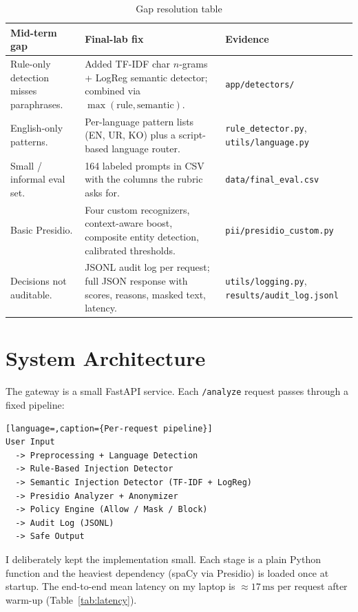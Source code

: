 \documentclass[conference]{IEEEtran}
\begin{document}
\begin{table}[t]
\caption{Gap resolution table}
\label{tab:gaps}
\centering
\footnotesize
\begin{tabular}{p{1.9cm}p{2.6cm}p{2.6cm}}
\toprule
\textbf{Mid-term gap} & \textbf{Final-lab fix} & \textbf{Evidence} \\
\midrule
Rule-only detection misses paraphrases. &
Added TF-IDF char $n$-grams + LogReg semantic detector; combined
via $\max(\textrm{rule}, \textrm{semantic})$. &
\texttt{app/detectors/} \\
English-only patterns. &
Per-language pattern lists (EN, UR, KO) plus a script-based language
router. &
\texttt{rule\_detector.py},
\texttt{utils/language.py} \\
Small / informal eval set. &
164 labeled prompts in CSV with the columns the rubric asks for. &
\texttt{data/final\_eval.csv} \\
Basic Presidio. &
Four custom recognizers, context-aware boost, composite entity
detection, calibrated thresholds. &
\texttt{pii/presidio\_custom.py} \\
Decisions not auditable. &
JSONL audit log per request; full JSON response with scores, reasons,
masked text, latency. &
\texttt{utils/logging.py},
\texttt{results/audit\_log.jsonl} \\
\bottomrule
\end{tabular}
\end{table}

\section{System Architecture}
The gateway is a small FastAPI service. Each \texttt{/analyze} request
passes through a fixed pipeline:

\begin{lstlisting}[language=,caption={Per-request pipeline}]
User Input
  -> Preprocessing + Language Detection
  -> Rule-Based Injection Detector
  -> Semantic Injection Detector (TF-IDF + LogReg)
  -> Presidio Analyzer + Anonymizer
  -> Policy Engine (Allow / Mask / Block)
  -> Audit Log (JSONL)
  -> Safe Output
\end{lstlisting}

I deliberately kept the implementation small. Each stage is a plain
Python function and the heaviest dependency (spaCy via Presidio) is
loaded once at startup. The end-to-end mean latency on my laptop is
$\approx 17\,\text{ms}$ per request after warm-up
(Table~\ref{tab:latency}).
\end{document}

